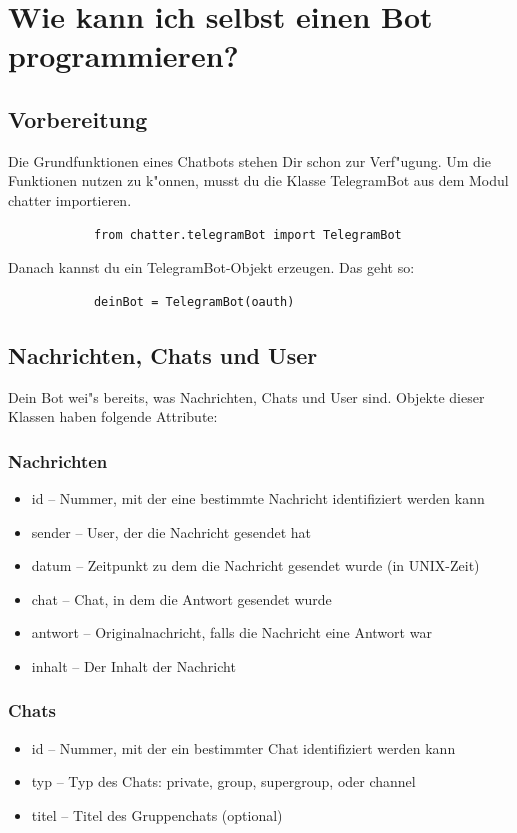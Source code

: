 \documentclass[a4paper]{article}
\begin{document}
		\section{Wie kann ich selbst einen Bot programmieren?}
		
		\subsection{Vorbereitung}
Die Grundfunktionen eines Chatbots stehen Dir schon zur Verf"ugung. Um die Funktionen nutzen zu k"onnen, musst du die Klasse TelegramBot aus dem Modul chatter importieren.

		\begin{verbatim}
			from chatter.telegramBot import TelegramBot
		\end{verbatim}

		Danach kannst du ein TelegramBot-Objekt erzeugen. Das geht so:

		\begin{verbatim}
			deinBot = TelegramBot(oauth)
		\end{verbatim}
		
		\subsection{Nachrichten, Chats und User}
		Dein Bot wei"s bereits, was Nachrichten, Chats und User sind. Objekte dieser Klassen haben folgende Attribute:
		
		\subsubsection{Nachrichten}
		\begin{itemize}
			\item id 			--	Nummer, mit der eine bestimmte Nachricht identifiziert werden kann
			\item sender	-- 	User, der die Nachricht gesendet hat
			\item datum		--	Zeitpunkt zu dem die Nachricht gesendet wurde (in UNIX-Zeit)
			\item chat		--	Chat, in dem die Antwort gesendet wurde
			\item antwort	--	Originalnachricht, falls die Nachricht eine Antwort war
			\item inhalt		--	Der Inhalt der Nachricht   
		\end{itemize}
		
		\subsubsection{Chats}
		\begin{itemize}
			\item id	--	Nummer, mit der ein bestimmter Chat identifiziert werden kann
			\item typ -- Typ des Chats: \grqq private\grqq , \grqq group\grqq , \grqq supergroup\grqq , oder \grqq channel\grqq
			\item titel -- Titel des Gruppenchats (optional)
		\end{itemize}
		
\end{document}
